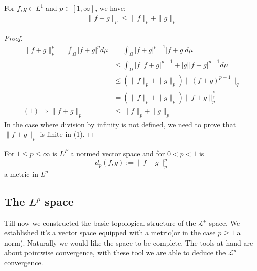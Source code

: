 \begin{theorem}
	For $f, g \in L^1$ and $p \in [1, \infty]$, we have:
	\begin{align*}
		\| f + g \|_p \leq \|f\|_p + \|g\|_p
	\end{align*}
\end{theorem}
\begin{proof}
	\begin{align*}
		\|f + g\|^p_p =
		\int_\Omega |f + g|^p d\mu &= \int_\Omega |f+g|^{p-1} |f + g| d\mu \\
		&\leq \int_\Omega |f| |f+g|^{p-1} + |g| |f+g|^{p-1} d\mu \\
		&\leq (\|f\|_p + \|g\|_p) \|(f + g)^{p-1}\|_q\\
		&= (\|f\|_p + \|g\|_p) \|f + g\|_p^{\frac{p}{q}}\\
		(1)\Rightarrow
		\|f + g\|_p &\leq \|f\|_p + \|g\|_p
	\end{align*}
	In the case where division by infinity is not defined, we need to prove that $\|f + g\|_p$ is finite in (1).
\end{proof}

\begin{theorem}
	For $1 \leq p \leq \infty$ is $L^P$ a normed vector space and for $0 < p < 1$ is 
	\begin{equation*}
		d_p(f, g) := \|f - g\|^p_p
	\end{equation*}
	a metric in $L^p$
\end{theorem}


\subsection{The $L^p$ space}
Till now we constructed the basic topological structure of the $\mathcal{L}^p$ space. We established it's a vector space equipped with a metric(or in the case $p \geq 1$ a norm). Naturally we would like the space to be complete. The tools at hand are about pointwise convergence, with these tool we are able to deduce the $\mathcal{L}^p$ convergence.  

